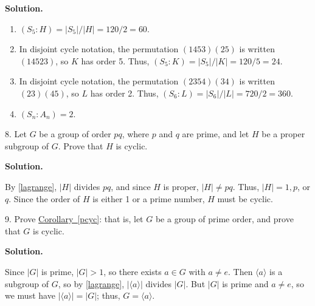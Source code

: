 \documentclass[10pt,]{book}
\theoremstyle{plain}
\theoremstyle{definition}
\theoremstyle{definition}
\theoremstyle{definition}
\theoremstyle{definition}
\numberwithin{equation}{section}
\begin{document}
\begin{exerciselist}
\par\smallskip
\par\smallskip
\noindent\textbf{Solution.}\hypertarget{solution-56}{}\quad
\leavevmode%
\begin{enumerate}[label=(\alph*)]
\item\hypertarget{li-481}{}
          \((S_5:H)=|S_5|/|H|=120/2=60.\)
\item\hypertarget{li-482}{}
          In disjoint cycle notation, the permutation \((1453)(25)\) is written \((14523)\), so \(K\) has order 5. Thus, \((S_5:K)=|S_5|/|K|=120/5=24.\)
\item\hypertarget{li-483}{}
          In disjoint cycle notation, the permutation \((2354)(34)\) is written \((23)(45)\), so \(L\) has order 2. Thus, \((S_6:L)=|S_6|/|L|=720/2=360.\)
\item\hypertarget{li-484}{}
          \((S_n:A_n)=2\).
\end{enumerate}
\item[8.]\hypertarget{exercise-57}{}
        Let \(G\) be a group of order \(pq\), where \(p\)
        and \(q\) are prime, and let \(H\) be a proper subgroup of
        \(G\). Prove that \(H\) is cyclic.
\par\smallskip
\par\smallskip
\noindent\textbf{Solution.}\hypertarget{solution-57}{}\quad

      By \hyperref[lagrange]{\ref{lagrange}}, \(|H|\) divides \(pq\), and since \(H\) is proper, \(|H|\neq  pq\).
      Thus, \(|H|=1,p\), or \(q\). Since the order of \(H\) is
      either 1 or a prime number, \(H\) must be cyclic.
\item[9.]\hypertarget{exercise-58}{}
        Prove \hyperref[pcyc]{Corollary~\ref{pcyc}}: that is, let \(G\) be a group of prime order, and prove that \(G\) is cyclic.
\par\smallskip
\par\smallskip
\noindent\textbf{Solution.}\hypertarget{solution-58}{}\quad

      Since \(|G|\) is prime, \(|G|>1\), so there exists \(a\in G\)
      with \(a\neq e\). Then \(\langle a\rangle\) is a subgroup of \(G\), so by
      \hyperref[lagrange]{\ref{lagrange}}, \(|\langle a\rangle |\) divides \(|G|\). But \(|G|\) is
      prime and \(a\neq e\), so we must have \(|\langle a\rangle |=|G|\); thus,
      \(G=\langle a\rangle\).
\end{exerciselist}
\typeout{************************************************}
\typeout{************************************************}
\end{document}
